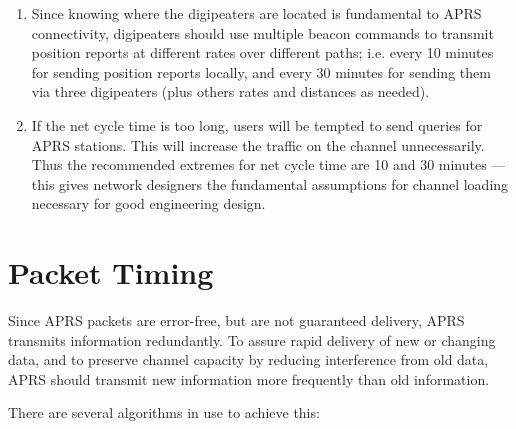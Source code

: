 \documentclass{scrreprt}[letter]
\begin{document}
\begin {enumerate}
\item Since knowing where the digipeaters are located is fundamental to APRS
connectivity, digipeaters should use multiple beacon commands to
transmit position reports at different rates over different paths; i.e. every
10 minutes for sending position reports locally, and every 30 minutes for
sending them via three digipeaters (plus others rates and distances as
needed).

\item If the net cycle time is too long, users will be tempted to send queries for
APRS stations. This will increase the traffic on the channel
unnecessarily. Thus the recommended extremes for net cycle time are 10
and 30 minutes — this gives network designers the fundamental
assumptions for channel loading necessary for good engineering design.

\end{enumerate}

\section {Packet Timing}

Since APRS packets are error-free, but are not guaranteed delivery, APRS
transmits information redundantly. To assure rapid delivery of new or
changing data, and to preserve channel capacity by reducing interference
from old data, APRS should transmit new information more frequently than
old information.

There are several algorithms in use to achieve this:
\end{document}
